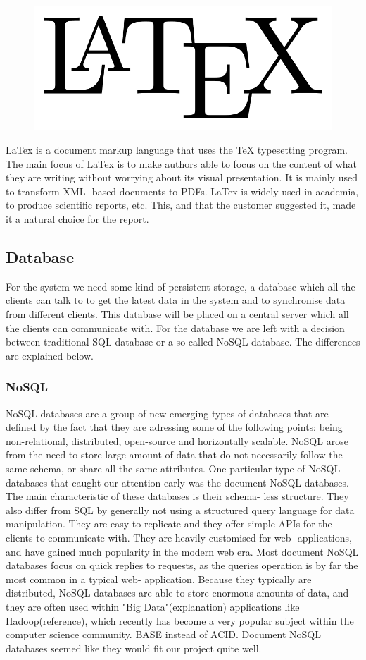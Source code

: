 \begin{figure}
\vspace{-30pt}
\centering
\includegraphics[width = .20\textwidth]{image/latex-logo.png}
\end{figure}

LaTex is a document markup language that uses the TeX typesetting program. The main focus of LaTex is to make authors able to focus on the content of what they are writing without worrying about its visual presentation. It is mainly used to transform XML- based documents to PDFs. LaTex is widely used in academia, to produce scientific reports, etc. This, and that the customer suggested it, made it a natural choice for the report. 

\subsection{Database}
For the system we need some kind of persistent storage, a database which all the clients can talk to to get the latest data in the system and to synchronise data from different clients. This database will be placed on a central server which all the clients can communicate with. For the database we are left with a decision between traditional SQL database or a so called NoSQL database. The differences are explained below.

\subsubsection*{NoSQL}
NoSQL databases are a group of new emerging types of databases that are defined by the fact that they are adressing some of the following points: being non-relational, distributed, open-source and horizontally scalable\cite{nosql}. NoSQL arose from the need to store large amount of data that do not necessarily follow the same schema, or share all the same attributes. One particular type of NoSQL databases that caught our attention early was the document NoSQL databases. The main characteristic of these databases is their schema- less structure. They also differ from SQL by generally not using a structured query language for data manipulation. They are easy to replicate and they offer simple APIs for the clients to communicate with. They are heavily customised for web- applications, and have gained much popularity in the modern web era. Most document NoSQL databases focus on quick replies to requests, as the queries operation is by far the most common in a typical web- application. Because they typically are distributed, NoSQL databases are able to store enormous amounts of data, and they are often used within "Big Data"(explanation) applications like Hadoop(reference), which recently has become a very popular subject within the computer science community. 
BASE \cite{pritchett} instead of ACID. 
Document NoSQL databases seemed like they would fit our project quite well.
\cite{nosql-databases}
\cite{nosql-article}

